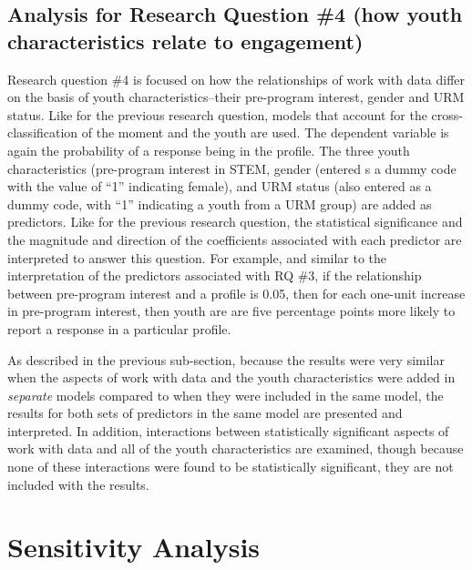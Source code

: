 \documentclass[]{book}
\theoremstyle{definition}
\theoremstyle{definition}
\theoremstyle{definition}
\theoremstyle{remark}
\begin{document}
\subsection{Analysis for Research Question \#4 (how youth
characteristics relate to
engagement)}\label{analysis-for-research-question-4-how-youth-characteristics-relate-to-engagement}

Research question \#4 is focused on how the relationships of work with
data differ on the basis of youth characteristics--their pre-program
interest, gender and URM status. Like for the previous research
question, models that account for the cross-classification of the moment
and the youth are used. The dependent variable is again the probability
of a response being in the profile. The three youth characteristics
(pre-program interest in STEM, gender (entered s a dummy code with the
value of ``1'' indicating female), and URM status (also entered as a
dummy code, with ``1'' indicating a youth from a URM group) are added as
predictors. Like for the previous research question, the statistical
significance and the magnitude and direction of the coefficients
associated with each predictor are interpreted to answer this question.
For example, and similar to the interpretation of the predictors
associated with RQ \#3, if the relationship between pre-program interest
and a profile is 0.05, then for each one-unit increase in pre-program
interest, then youth are are five percentage points more likely to
report a response in a particular profile.

As described in the previous sub-section, because the results were very
similar when the aspects of work with data and the youth characteristics
were added in \emph{separate} models compared to when they were included
in the same model, the results for both sets of predictors in the same
model are presented and interpreted. In addition, interactions between
statistically significant aspects of work with data and all of the youth
characteristics are examined, though because none of these interactions
were found to be statistically significant, they are not included with
the results.

\section{Sensitivity Analysis}\label{sensitivity-analysis}
\end{document}
